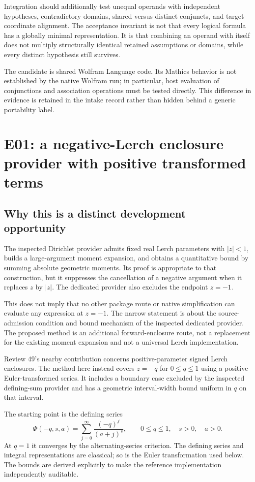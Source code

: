 \documentclass[11pt,a4paper]{article}
\begin{document}
Integration should additionally test unequal operands with independent hypotheses, contradictory domains, shared versus distinct conjuncts, and target-coordinate alignment. The acceptance invariant is not that every logical formula has a globally minimal representation. It is that combining an operand with itself does not multiply structurally identical retained assumptions or domains, while every distinct hypothesis still survives.

The candidate is shared Wolfram Language code. Its Mathics behavior is not established by the native Wolfram run; in particular, host evaluation of conjunctions and association operations must be tested directly. This difference in evidence is retained in the intake record rather than hidden behind a generic portability label.

\section{E01: a negative-Lerch enclosure provider with positive transformed terms}
\label{sec:lerch}
\subsection{Why this is a distinct development opportunity}
The inspected Dirichlet provider admits fixed real Lerch parameters with $|z|<1$, builds a large-argument moment expansion, and obtains a quantitative bound by summing absolute geometric moments. Its proof is appropriate to that construction, but it suppresses the cancellation of a negative argument when it replaces $z$ by $|z|$. The dedicated provider also excludes the endpoint $z=-1$.\cite{dirichlet}

This does not imply that no other package route or native simplification can evaluate any expression at $z=-1$. The narrow statement is about the source-admission condition and bound mechanism of the inspected dedicated provider. The proposed method is an additional forward-enclosure route, not a replacement for the existing moment expansion and not a universal Lerch implementation.

Review 49's nearby contribution concerns positive-parameter signed Lerch enclosures. The method here instead covers $z=-q$ for $0\le q\le1$ using a positive Euler-transformed series. It includes a boundary case excluded by the inspected defining-sum provider and has a geometric interval-width bound uniform in $q$ on that interval.\cite{r49}

The starting point is the defining series
\begin{equation}
 \Phi(-q,s,a)=\sum_{j=0}^{\infty}\frac{(-q)^j}{(a+j)^s},
 \qquad 0\le q\le1,\quad s>0,\quad a>0.
\label{eq:lerchdef}
\end{equation}
At $q=1$ it converges by the alternating-series criterion. The defining series and integral representations are classical; so is the Euler transformation used below. The bounds are derived explicitly to make the reference implementation independently auditable.\cite{lerchref,euler}
\end{document}
